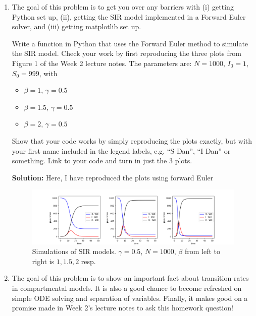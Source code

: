 \documentclass[11pt]{article}
\begin{document}
\begin{enumerate}

\item The goal of this problem is to get you over any barriers with (i) getting Python set up, (ii), getting the SIR model implemented in a Forward Euler solver, and (iii) getting matplotlib set up.
	
	Write a function in Python that uses the Forward Euler method to simulate the SIR model. Check your work by first reproducing the three plots from Figure 1 of the Week 2 lecture notes. The parameters are: $N=1000$, $I_0=1$, $S_0=999$, with 
	\begin{itemize}
		\item $\beta=1$, $\gamma=0.5$
		\item $\beta = 1.5$, $\gamma=0.5$
		\item $\beta = 2$, $\gamma=0.5$
	\end{itemize}
	Show that your code works by simply reproducing the plots exactly, but with your first name included in the legend labels, e.g. ``S Dan'', ``I Dan'' or something. Link to your code and turn in just the 3 plots. 
	
	\begin{tcolorbox}[breakable]
		\textbf{Solution:} Here, I have reproduced the plots using forward Euler
	\end{tcolorbox}

	\begin{figure}[H]
		\centering
		\includegraphics[scale=0.5]{p1.png}
		\caption{Simulations of SIR models. $\gamma=0.5$, $N=1000$, $\beta$ from left to right is $1, 1.5,2$ resp.}
	\end{figure}
	
\clearpage
\item The goal of this problem is to show an important fact about transition rates in compartmental models. It is also a good chance to become refreshed on simple ODE solving and separation of variables. Finally, it makes good on a promise made in Week 2's lecture notes to ask this homework question!
	

\end{enumerate}
\end{document}
